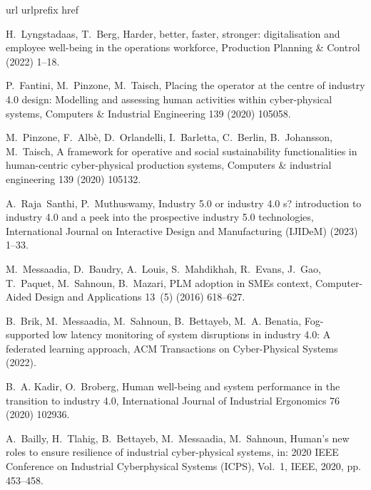\documentclass[review,12pt, 3p, times]{elsarticle}
\begin{document}
\begin{thebibliography}{10}
	\expandafter\ifx\csname url\endcsname\relax
	\def\url#1{\texttt{#1}}\fi
	\expandafter\ifx\csname urlprefix\endcsname\relax\def\urlprefix{URL }\fi
	\expandafter\ifx\csname href\endcsname\relax
	\def\href#1#2{#2} \def\path#1{#1}\fi
	
	H.~Lyngstadaas, T.~Berg, Harder, better, faster, stronger: digitalisation and
	employee well-being in the operations workforce, Production Planning \&
	Control (2022) 1--18.
	
	P.~Fantini, M.~Pinzone, M.~Taisch, Placing the operator at the centre of
	industry 4.0 design: Modelling and assessing human activities within
	cyber-physical systems, Computers \& Industrial Engineering 139 (2020)
	105058.
	
	M.~Pinzone, F.~Alb{\`e}, D.~Orlandelli, I.~Barletta, C.~Berlin, B.~Johansson,
	M.~Taisch, A framework for operative and social sustainability
	functionalities in human-centric cyber-physical production systems, Computers
	\& industrial engineering 139 (2020) 105132.
	
	A.~Raja~Santhi, P.~Muthuswamy, Industry 5.0 or industry 4.0 s? introduction to
	industry 4.0 and a peek into the prospective industry 5.0 technologies,
	International Journal on Interactive Design and Manufacturing (IJIDeM) (2023)
	1--33.
	
	M.~Messaadia, D.~Baudry, A.~Louis, S.~Mahdikhah, R.~Evans, J.~Gao, T.~Paquet,
	M.~Sahnoun, B.~Mazari, {PLM} adoption in {SME}s context, Computer-Aided
	Design and Applications 13~(5) (2016) 618--627.
	
	B.~Brik, M.~Messaadia, M.~Sahnoun, B.~Bettayeb, M.~A. Benatia, Fog-supported
	low latency monitoring of system disruptions in industry 4.0: A federated
	learning approach, ACM Transactions on Cyber-Physical Systems (2022).
	
	B.~A. Kadir, O.~Broberg, Human well-being and system performance in the
	transition to industry 4.0, International Journal of Industrial Ergonomics 76
	(2020) 102936.
	
	A.~Bailly, H.~Tlahig, B.~Bettayeb, M.~Messaadia, M.~Sahnoun, Human’s new
	roles to ensure resilience of industrial cyber-physical systems, in: 2020
	IEEE Conference on Industrial Cyberphysical Systems (ICPS), Vol.~1, IEEE,
	2020, pp. 453--458.
	

\end{thebibliography}
\end{document}
